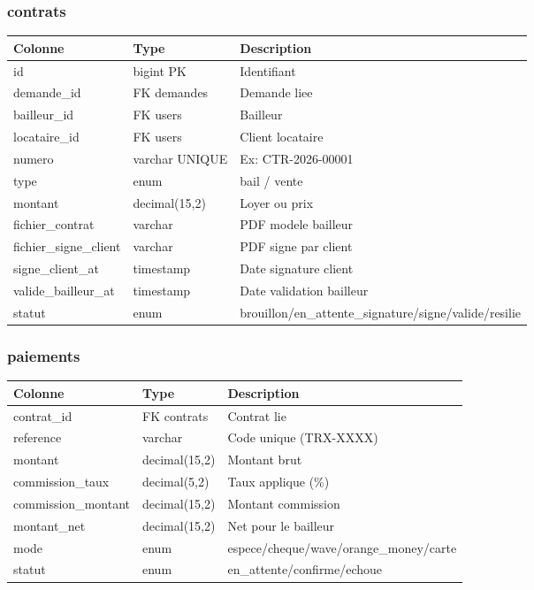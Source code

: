 \documentclass[12pt,a4paper]{article}
\begin{document}
\subsubsection{contrats}
\begin{center}
\begin{tabular}{|p{3.5cm}|p{3cm}|p{6cm}|}
\hline
\textbf{Colonne} & \textbf{Type} & \textbf{Description} \\
\hline
id & bigint PK & Identifiant \\
demande\_id & FK demandes & Demande liee \\
bailleur\_id & FK users & Bailleur \\
locataire\_id & FK users & Client locataire \\
numero & varchar UNIQUE & Ex: CTR-2026-00001 \\
type & enum & bail / vente \\
montant & decimal(15,2) & Loyer ou prix \\
fichier\_contrat & varchar & PDF modele bailleur \\
fichier\_signe\_client & varchar & PDF signe par client \\
signe\_client\_at & timestamp & Date signature client \\
valide\_bailleur\_at & timestamp & Date validation bailleur \\
statut & enum & brouillon/en\_attente\_signature/signe/valide/resilie \\
\hline
\end{tabular}
\end{center}

\subsubsection{paiements}
\begin{center}
\begin{tabular}{|p{3.5cm}|p{3cm}|p{6cm}|}
\hline
\textbf{Colonne} & \textbf{Type} & \textbf{Description} \\
\hline
contrat\_id & FK contrats & Contrat lie \\
reference & varchar & Code unique (TRX-XXXX) \\
montant & decimal(15,2) & Montant brut \\
commission\_taux & decimal(5,2) & Taux applique (\%) \\
commission\_montant & decimal(15,2) & Montant commission \\
montant\_net & decimal(15,2) & Net pour le bailleur \\
mode & enum & espece/cheque/wave/orange\_money/carte \\
statut & enum & en\_attente/confirme/echoue \\
\hline
\end{tabular}
\end{center}
\end{document}
